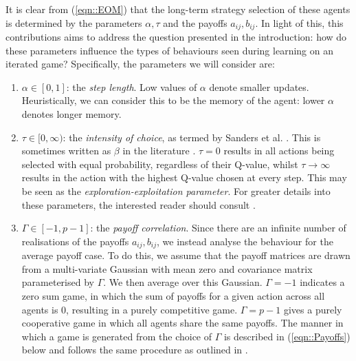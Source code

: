 \documentclass[sigconf,anonymous]{aamas}
\begin{document}
It is clear from (\ref{eqn::EOM}) that the long-term strategy
selection of these agents is determined by the parameters $\alpha,
\tau$ and the payoffs $a_{ij}, b_{ij}$. In light of this, this
contributions aims to address the question presented in the
introduction: how do these parameters influence the types of behaviours
seen during learning on an iterated game? Specifically, the parameters
we will consider are:
%
\begin{enumerate}
    \item $\alpha \in [0, 1]$: the \textit{step length}. Low values of $\alpha$ denote smaller
    updates. Heuristically, we can consider this to be the memory of the agent: lower $\alpha$
    denotes longer memory.
    
    \item $\tau \in [0, \infty)$: the \textit{intensity of choice}, as
      termed by Sanders et al.  \cite{Sanders2018}. This is sometimes
      written as $\beta$ in the literature \cite{Sutton2018}.  $\tau =
      0$ results in all actions being selected with equal probability,
      regardless of their Q-value, whilst $\tau \rightarrow \infty$
      results in the action with the highest Q-value chosen at every
      step. This may be seen as the \textit{exploration-exploitation
        parameter}. For greater details into these parameters, the
      interested reader should consult \cite{Sutton2018}.
    
    \item $\Gamma \in [-1, p-1]$: the \textit{payoff
      correlation}. Since there are an infinite number of realisations
      of the payoffs $a_{ij}, b_{ij}$, we instead analyse the
      behaviour for the average payoff case. To do this, we assume
      that the payoff matrices are drawn from a multi-variate Gaussian
      with mean zero and covariance matrix parameterised by
      $\Gamma$. We then average over this Gaussian. $\Gamma = -1$
      indicates a zero sum game, in which the sum of payoffs for a
      given action across all agents is 0, resulting in a purely
      competitive game. $\Gamma = p-1$ gives a purely cooperative game
      in which all agents share the same payoffs. The manner in which
      a game is generated from the choice of $\Gamma$ is described in
      (\ref{eqn::Payoffs}) below and follows the same procedure as
      outlined in \cite{Sanders2018}.
\end{enumerate}

\end{document}
